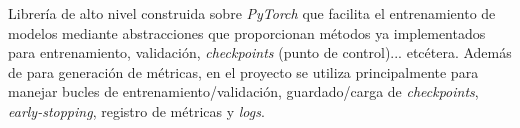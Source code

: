 Librería de alto nivel construida sobre \textit{PyTorch} que facilita el entrenamiento de modelos mediante abstracciones que proporcionan métodos ya implementados para entrenamiento, validación, \textit{checkpoints} (punto de control)... etcétera. Además de para generación de métricas, en el proyecto se utiliza principalmente para manejar bucles de entrenamiento/validación, guardado/carga de \textit{checkpoints}, \textit{early-stopping}, registro de métricas y \textit{logs}.